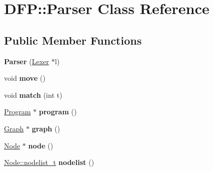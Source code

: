 \hypertarget{class_d_f_p_1_1_parser}{}\section{D\+FP\+:\+:Parser Class Reference}
\label{class_d_f_p_1_1_parser}
\subsection*{Public Member Functions}
\begin{DoxyCompactItemize}
\item 
{\bfseries Parser} (\hyperlink{class_d_f_p_1_1_lexer}{Lexer} $\ast$l)\hypertarget{class_d_f_p_1_1_parser_a7f48d3c0a6dcb12cf40a95ebd36c1627}{}\label{class_d_f_p_1_1_parser_a7f48d3c0a6dcb12cf40a95ebd36c1627}

\item 
void {\bfseries move} ()\hypertarget{class_d_f_p_1_1_parser_a4ba579f89d51d234369980b746a74d93}{}\label{class_d_f_p_1_1_parser_a4ba579f89d51d234369980b746a74d93}

\item 
void {\bfseries match} (int t)\hypertarget{class_d_f_p_1_1_parser_a78f9e18b8de4c3590beae7ea04037651}{}\label{class_d_f_p_1_1_parser_a78f9e18b8de4c3590beae7ea04037651}

\item 
\hyperlink{class_d_f_p_1_1_program}{Program} $\ast$ {\bfseries program} ()\hypertarget{class_d_f_p_1_1_parser_a90bfc769259c19c87b38621873979caf}{}\label{class_d_f_p_1_1_parser_a90bfc769259c19c87b38621873979caf}

\item 
\hyperlink{class_d_f_p_1_1_graph}{Graph} $\ast$ {\bfseries graph} ()\hypertarget{class_d_f_p_1_1_parser_a952e9d99f203e4ed0b0bcddf881bcab4}{}\label{class_d_f_p_1_1_parser_a952e9d99f203e4ed0b0bcddf881bcab4}

\item 
\hyperlink{class_d_f_p_1_1_node}{Node} $\ast$ {\bfseries node} ()\hypertarget{class_d_f_p_1_1_parser_af1d347b564b46208d41d6867d138da27}{}\label{class_d_f_p_1_1_parser_af1d347b564b46208d41d6867d138da27}

\item 
\hyperlink{class_d_f_p_1_1_node_a9dc2ef0c0546df091e01cd0df2cc12d9}{Node\+::nodelist\+\_\+t} {\bfseries nodelist} ()\hypertarget{class_d_f_p_1_1_parser_aa19cce628b0caf2492b43b5443c308d6}{}\label{class_d_f_p_1_1_parser_aa19cce628b0caf2492b43b5443c308d6}


\end{DoxyCompactItemize}

